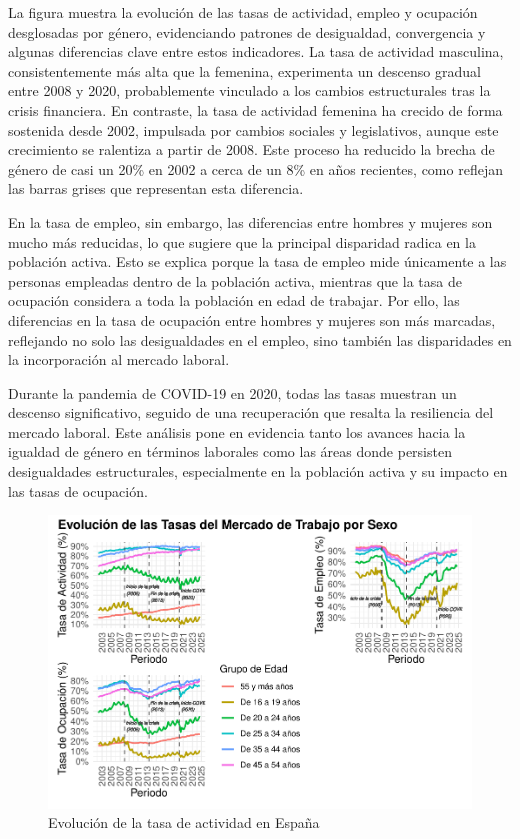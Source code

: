 \documentclass[notspecified,article,submit,moreauthors,pdftex]{Definitions/mdpi}
\begin{document}
La figura muestra la evolución de las tasas de actividad, empleo y
ocupación desglosadas por género, evidenciando patrones de desigualdad,
convergencia y algunas diferencias clave entre estos indicadores. La
tasa de actividad masculina, consistentemente más alta que la femenina,
experimenta un descenso gradual entre 2008 y 2020, probablemente
vinculado a los cambios estructurales tras la crisis financiera. En
contraste, la tasa de actividad femenina ha crecido de forma sostenida
desde 2002, impulsada por cambios sociales y legislativos, aunque este
crecimiento se ralentiza a partir de 2008. Este proceso ha reducido la
brecha de género de casi un 20\% en 2002 a cerca de un 8\% en años
recientes, como reflejan las barras grises que representan esta
diferencia.

En la tasa de empleo, sin embargo, las diferencias entre hombres y
mujeres son mucho más reducidas, lo que sugiere que la principal
disparidad radica en la población activa. Esto se explica porque la tasa
de empleo mide únicamente a las personas empleadas dentro de la
población activa, mientras que la tasa de ocupación considera a toda la
población en edad de trabajar. Por ello, las diferencias en la tasa de
ocupación entre hombres y mujeres son más marcadas, reflejando no solo
las desigualdades en el empleo, sino también las disparidades en la
incorporación al mercado laboral.

Durante la pandemia de COVID-19 en 2020, todas las tasas muestran un
descenso significativo, seguido de una recuperación que resalta la
resiliencia del mercado laboral. Este análisis pone en evidencia tanto
los avances hacia la igualdad de género en términos laborales como las
áreas donde persisten desigualdades estructurales, especialmente en la
población activa y su impacto en las tasas de ocupación.

\begin{figure}[h]

{\centering \includegraphics[width=1\linewidth]{ProyectoAED2024_files/figure-latex/unnamed-chunk-30-1} 

}

\caption{Evolución de la tasa de actividad en España}\label{fig:unnamed-chunk-30}
\end{figure}
\end{document}
